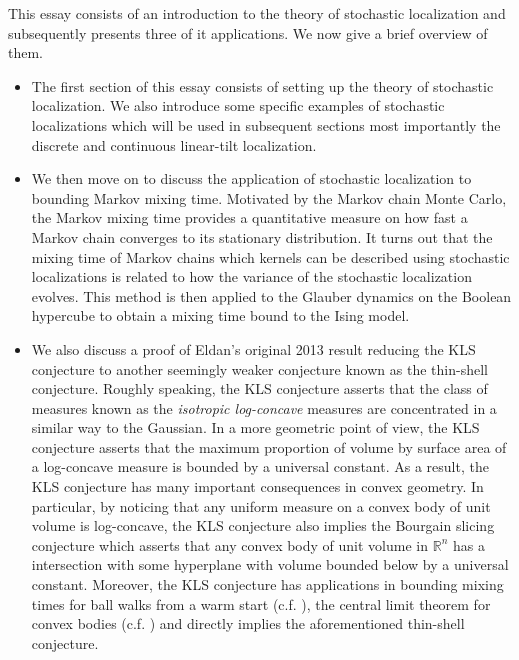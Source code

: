 This essay consists of an introduction to the theory of stochastic localization and subsequently presents three 
of it applications. We now give a brief overview of them.

\begin{itemize}
  \item The first section of this essay consists of setting up the theory of stochastic localization.
    We also introduce some specific examples of stochastic localizations which will be used in subsequent 
    sections most importantly the discrete and continuous linear-tilt localization. 
  \item We then move on to discuss the application of stochastic localization to bounding Markov 
    mixing time. Motivated by the Markov chain Monte Carlo, the Markov mixing time provides a quantitative 
    measure on how fast a Markov chain converges to its stationary distribution. It turns out that 
    the mixing time of Markov chains which kernels can be described using stochastic localizations 
    is related to how the variance of the stochastic localization evolves. This method is then applied  
    to the Glauber dynamics on the Boolean hypercube to obtain a mixing time bound to the Ising model. 
  \item We also discuss a proof of Eldan's original 2013 result reducing the KLS conjecture to another seemingly 
    weaker conjecture known as the thin-shell conjecture. Roughly speaking, the KLS conjecture asserts 
    that the class of measures known as the \textit{isotropic log-concave} measures are concentrated in a similar 
    way to the Gaussian. In a more geometric point of view, the KLS conjecture asserts that the 
    maximum proportion of volume by surface area of a log-concave measure is bounded by a universal constant. 
    As a result, the KLS conjecture has many important consequences in convex geometry. 
    In particular, by noticing that any uniform measure on a convex body of unit volume is log-concave, 
    the KLS conjecture also implies the Bourgain slicing conjecture which asserts that any convex body 
    of unit volume in \(\mathbb{R}^n\) has a intersection with some hyperplane with volume bounded below 
    by a universal constant. Moreover, the KLS conjecture has applications in bounding mixing times for 
    ball walks from a warm start (c.f. \cite{Lee_2016}), the central limit theorem for convex bodies (c.f. \cite{Giannopoulos}) 
    and directly implies the aforementioned thin-shell conjecture. 

    

\end{itemize}
